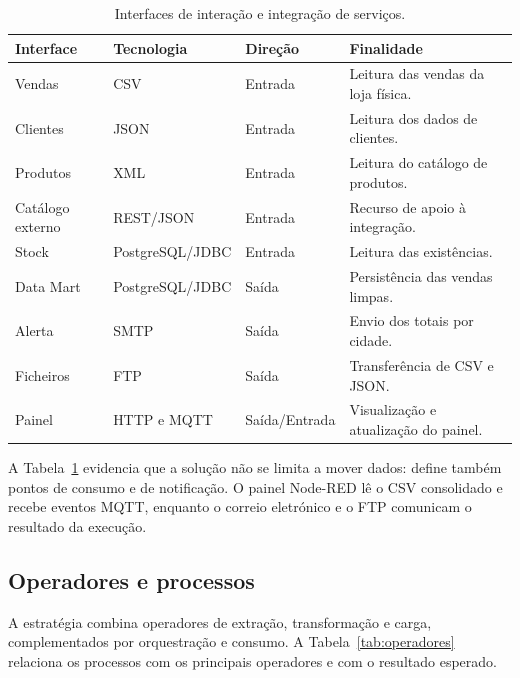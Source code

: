\documentclass[11pt,a4paper]{article}
\begin{document}
\begin{table}[H]
\centering
\small
\begin{tabular}{|p{2.2cm}|p{3.2cm}|p{2.1cm}|p{4.7cm}|}
\hline
Interface & Tecnologia & Direção & Finalidade \\ \hline
Vendas & CSV & Entrada & Leitura das vendas da loja física. \\ \hline
Clientes & JSON & Entrada & Leitura dos dados de clientes. \\ \hline
Produtos & XML & Entrada & Leitura do catálogo de produtos. \\ \hline
Catálogo externo & REST/JSON & Entrada & Recurso de apoio à integração. \\ \hline
Stock & PostgreSQL/JDBC & Entrada & Leitura das existências. \\ \hline
Data Mart & PostgreSQL/JDBC & Saída & Persistência das vendas limpas. \\ \hline
Alerta & SMTP & Saída & Envio dos totais por cidade. \\ \hline
Ficheiros & FTP & Saída & Transferência de CSV e JSON. \\ \hline
Painel & HTTP e MQTT & Saída/Entrada & Visualização e atualização do painel. \\ \hline
\end{tabular}
\caption{Interfaces de interação e integração de serviços.}
\label{tab:interfaces}
\end{table}

A Tabela~\ref{tab:interfaces} evidencia que a solução não se limita a mover dados: define também pontos de consumo e de notificação. O painel Node-RED lê o CSV consolidado e recebe eventos MQTT, enquanto o correio eletrónico e o FTP comunicam o resultado da execução.

\subsection{Operadores e processos}
A estratégia combina operadores de extração, transformação e carga, complementados por orquestração e consumo. A Tabela~\ref{tab:operadores} relaciona os processos com os principais operadores e com o resultado esperado.
\end{document}
